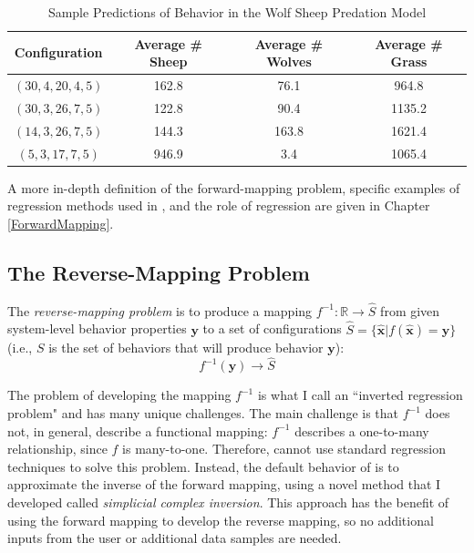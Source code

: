 \begin{table}[ht]
  \caption{Sample Predictions of Behavior in the Wolf Sheep Predation Model}
  \centering
  \begin{tabular}{c c c c}
    \hline \hline
    Configuration & Average \# Sheep & Average \# Wolves & Average \# Grass \\
    \hline
    $(30, 4, 20, 4, 5)$ & 162.8 & 76.1 & 964.8 \\
    $(30, 3, 26, 7, 5)$ & 122.8 & 90.4 & 1135.2 \\
    $(14, 3, 26, 7, 5)$ & 144.3 & 163.8 & 1621.4 \\
    $(5, 3, 17, 7, 5)$ & 946.9 & 3.4 & 1065.4 \\
    \hline
  \end{tabular}
  \label{table:ws_predictions}
\end{table}


A more in-depth definition of the forward-mapping problem, specific examples of regression methods used in \fw, and the role of regression are given in Chapter \ref{ForwardMapping}.


\subsection{The Reverse-Mapping Problem}



The \textit{reverse-mapping problem} is to produce a mapping $ f^{-1}: \mathbb{R} \rightarrow \hat S$ from given system-level behavior properties $\mathbf y$ to a set of
configurations $ \hat S = \{ \mathbf {\hat x} | f( \mathbf {\hat x}) = \mathbf y \}$
(i.e., $S$ is the set of behaviors that will produce behavior $\mathbf y$):
\[f^{-1}(\mathbf y) \rightarrow \hat S\]


The problem of developing the mapping $f^{-1}$ is what I call an ``inverted regression problem" and has many unique challenges.
The main challenge is that $f^{-1}$ does not, in general, describe a functional mapping:
$f^{-1}$ describes a one-to-many relationship, since $f$ is many-to-one.
Therefore, \fw cannot use standard regression techniques to solve this problem.
Instead, the default behavior of \fw is to approximate the inverse of the forward mapping, using a novel method that I developed called \textit{simplicial complex inversion}.
This approach has the benefit of using the forward mapping to develop the reverse mapping, so no additional inputs from the user or additional data samples are needed.

